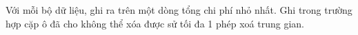 Với mỗi bộ dữ liệu, ghi ra trên một dòng tổng chi phí nhỏ nhất. Ghi   trong trường hợp cặp ô đã cho không thể xóa được sử tối đa 1 phép xoá trung gian.  

\